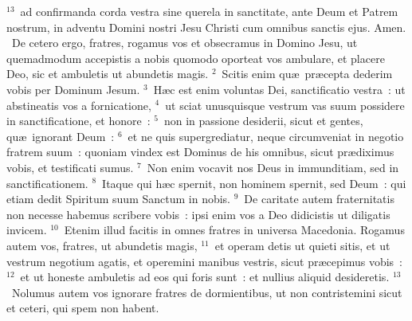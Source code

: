 ${}^{13}$~ad confirmanda corda vestra sine querela in sanctitate, ante Deum et Patrem nostrum, in adventu Domini nostri Jesu Christi cum omnibus sanctis ejus. Amen.
~\lettrine[lines=10,image=true,loversize=0.05,lraise=-0.03]{D}{}e cetero ergo, fratres, rogamus vos et obsecramus in Domino Jesu, ut quemadmodum accepistis a nobis quomodo oporteat vos ambulare, et placere Deo, sic et ambuletis ut abundetis magis.
${}^{2}$~Scitis enim qu\ae\ pr\ae cepta dederim vobis per Dominum Jesum.
${}^{3}$~H\ae c est enim voluntas Dei, sanctificatio vestra~: ut abstineatis vos a fornicatione,
${}^{4}$~ut sciat unusquisque vestrum vas suum possidere in sanctificatione, et honore~:
${}^{5}$~non in passione desiderii, sicut et gentes, qu\ae\ ignorant Deum~:
${}^{6}$~et ne quis supergrediatur, neque circumveniat in negotio fratrem suum~: quoniam vindex est Dominus de his omnibus, sicut pr\ae diximus vobis, et testificati sumus.
${}^{7}$~Non enim vocavit nos Deus in immunditiam, sed in sanctificationem.
${}^{8}$~Itaque qui h\ae c spernit, non hominem spernit, sed Deum~: qui etiam dedit Spiritum suum Sanctum in nobis.
${}^{9}$~De caritate autem fraternitatis non necesse habemus scribere vobis~: ipsi enim vos a Deo didicistis ut diligatis invicem.
${}^{10}$~Etenim illud facitis in omnes fratres in universa Macedonia. Rogamus autem vos, fratres, ut abundetis magis,
${}^{11}$~et operam detis ut quieti sitis, et ut vestrum negotium agatis, et operemini manibus vestris, sicut pr\ae cepimus vobis~:
${}^{12}$~et ut honeste ambuletis ad eos qui foris sunt~: et nullius aliquid desideretis.
${}^{13}$~Nolumus autem vos ignorare fratres de dormientibus, ut non contristemini sicut et ceteri, qui spem non habent.


